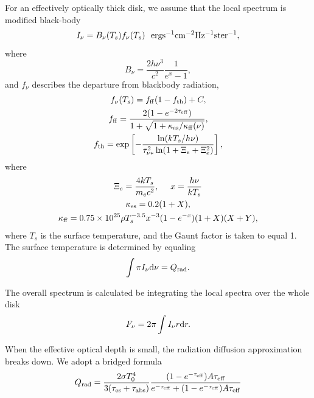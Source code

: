 \documentclass[oneside]{book}
\def\rd{{\rm d}}
\begin{document}
For an effectively optically thick disk, we assume that the local spectrum is modified black-body
\begin{equation}
I_\nu=B_\nu(T_s)f_\nu(T_s)
~~{\rm erg s^{-1} cm^{-2} Hz^{-1} ster^{-1}},
\end{equation}
where 
\begin{equation}
B_\nu=\frac{2h\nu^3}{c^2}\frac{1}{e^{x}-1},
\end{equation}
and $f_\nu$ describes the departure from blackbody radiation, 
\begin{gather}
f_\nu(T_s)=f_{\rm ff}(1-f_{\rm th}) +C,\\
f_{\rm ff}=\frac{2(1-e^{-2\tau_{\rm eff}})}{1+\sqrt{1+\kappa_{\rm es}/\kappa_{\rm ff}(\nu)}},\\
f_{\rm th}=\exp\left[-\frac{\ln(kT_s/h\nu)}{\tau_{\nu*}^2\ln(1+\Xi_e+\Xi_e^2)}\right],
\end{gather}
where
\begin{gather}
\Xi_e=\frac{4kT_s}{m_ec^2},~~~~x=\frac{h\nu}{kT_s}\\
\kappa_{\rm es}=0.2(1+X),\\
\kappa_{\rm ff}=0.75\times10^{25}\rho T_s^{-3.5}x^{-3}(1-e^{-x})(1+X)(X+Y),
\end{gather}
where $T_s$ is the surface temperature, and the Gaunt factor is taken to equal 1.
The surface temperature is determined by equaling 
\begin{equation}
\int \pi I_\nu\rd\nu=Q_{\rm rad}.
\end{equation}



The overall spectrum is calculated be integrating the local spectra over the whole disk
\begin{equation}
F_\nu=2\pi\int I_\nu r \rd r.
\end{equation}

When the effective optical depth is small, the radiation diffusion approximation breaks down.
We adopt a bridged formula
\begin{equation}
Q_{\rm rad}=\frac{2\sigma T_0^4}{3(\tau_{\rm es}+\tau_{\rm abs})}
\frac{(1-e^{-\tau_{\rm eff}})A\tau_{\rm eff}}{e^{-\tau_{\rm eff}}+(1-e^{-\tau_{\rm eff}})A\tau_{\rm eff}}
\end{equation}
\end{document}
